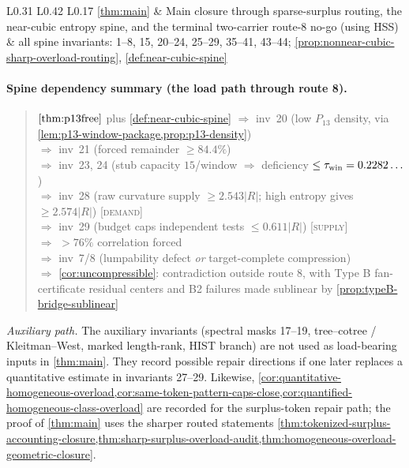 \documentclass[11pt]{article}
\begin{document}
{\begin{longtable}{L{0.31\textwidth} L{0.42\textwidth} L{0.17\textwidth}}
\cref{thm:main} & Main closure through sparse-surplus routing, the near-cubic entropy spine, and the terminal two-carrier route-8 no-go (using HSS) & all spine invariants: 1--8, 15, 20--24, 25--29, 35--41, 43--44; \cref{prop:nonnear-cubic-sharp-overload-routing}, \cref{def:near-cubic-spine} \\
\bottomrule
\end{longtable}
}

\paragraph{Spine dependency summary (the load path through route 8).}
\begin{quote}\small\raggedright
$\cref{thm:p13free}$ plus \cref{def:near-cubic-spine} $\Rightarrow$ inv~20 (low $P_{13}$ density, via \cref{lem:p13-window-package,prop:p13-density}) \\
$\Rightarrow$ inv~21 (forced remainder $\ge84.4\%$) \\
$\Rightarrow$ inv~23, 24 (stub capacity $15$/window $\Rightarrow$ deficiency $\le\tau_{\rm win}=0.2282\ldots$) \\
$\Rightarrow$ inv~28 (raw curvature supply $\ge2.543|R|$; high entropy gives $\ge2.574|R|$) \hfill [\textsc{demand}] \\
$\Rightarrow$ inv~29 (budget caps independent tests $\le0.611|R|$) \hfill [\textsc{supply}] \\
$\Rightarrow$ $>76\%$ correlation forced \\
$\Rightarrow$ inv~7/8 (lumpability defect \emph{or} target-complete compression) \\
$\Rightarrow$ \cref{cor:uncompressible}: contradiction outside route 8, with
Type B fan-certificate residual centers and B2 failures made sublinear by
\cref{prop:typeB-bridge-sublinear}
\end{quote}
\noindent\emph{Auxiliary path.}  The auxiliary invariants (spectral masks
17--19, tree--cotree / Kleitman--West, marked length-rank, HIST branch) are not
used as load-bearing inputs in \cref{thm:main}.  They record possible repair
directions if one later replaces a quantitative estimate in invariants 27--29.
Likewise,
\cref{cor:quantitative-homogeneous-overload,cor:same-token-pattern-caps-close,cor:quantified-homogeneous-class-overload}
are recorded for the surplus-token repair path; the proof of
\cref{thm:main} uses the sharper routed statements
\cref{thm:tokenized-surplus-accounting-closure,thm:sharp-surplus-overload-audit,thm:homogeneous-overload-geometric-closure}.
\end{document}
